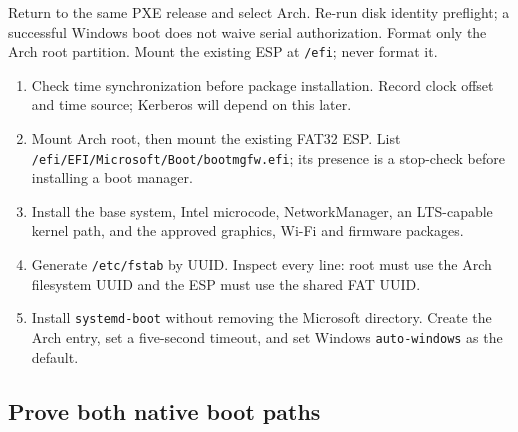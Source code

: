 Return to the same PXE release and select Arch. Re-run disk identity preflight;
a successful Windows boot does not waive serial authorization. Format only the
Arch root partition. Mount the existing ESP at \texttt{/efi}; never format it.

\begin{enumerate}
\item Check time synchronization before package installation. Record clock
offset and time source; Kerberos will depend on this later.
\item Mount Arch root, then mount the existing FAT32 ESP. List
\texttt{/efi/EFI/Microsoft/Boot/bootmgfw.efi}; its presence is a stop-check
before installing a boot manager.
\item Install the base system, Intel microcode, NetworkManager, an LTS-capable
kernel path, and the approved graphics, Wi-Fi and firmware packages.
\item Generate \texttt{/etc/fstab} by UUID. Inspect every line: root must use
the Arch filesystem UUID and the ESP must use the shared FAT UUID.
\item Install \texttt{systemd-boot} without removing the Microsoft directory.
Create the Arch entry, set a five-second timeout, and set Windows
\texttt{auto-windows} as the default.
\end{enumerate}



\subsection{Prove both native boot paths}

